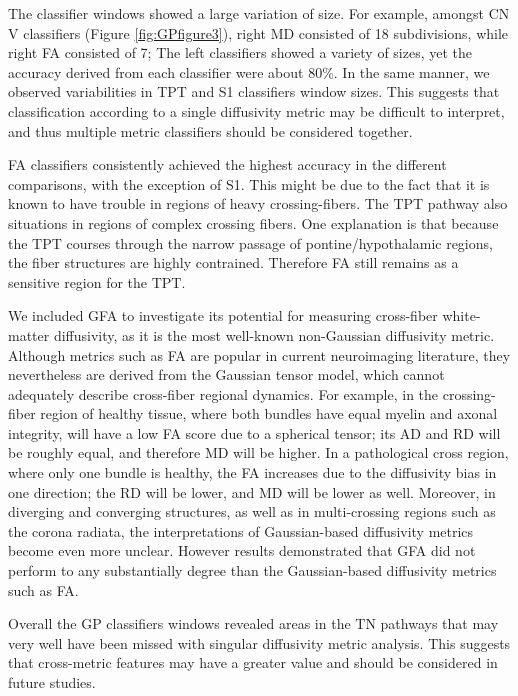 The classifier windows showed a large variation of size. For example, amongst CN V classifiers (Figure \ref{fig:GPfigure3}), right MD consisted of 18 subdivisions, while right FA consisted of 7; The left classifiers showed a variety of sizes, yet the accuracy derived from each classifier were about 80\%. In the same manner, we observed variabilities in TPT and S1 classifiers window sizes. This suggests that classification according to a single diffusivity metric may be difficult to interpret, and thus multiple metric classifiers should be considered together. 

FA classifiers consistently achieved the highest accuracy in the different comparisons, with the exception of S1. This might be due to the fact that it is known to have trouble in regions of heavy crossing-fibers. The TPT pathway also situations in regions of complex crossing fibers. One explanation is that because the TPT courses through the narrow passage of pontine/hypothalamic regions, the fiber structures are highly contrained. Therefore FA still remains as a sensitive region for the TPT. 

We included GFA to investigate its potential for measuring cross-fiber white-matter diffusivity, as it is the most well-known non-Gaussian diffusivity metric. Although metrics such as FA are popular in current neuroimaging literature, they nevertheless are derived from the Gaussian tensor model, which cannot adequately describe cross-fiber regional dynamics. For example, in the crossing-fiber region of healthy tissue, where both bundles have equal myelin and axonal integrity, will have a low FA score due to a spherical tensor; its AD and RD will be roughly equal, and therefore MD will be higher. In a pathological cross region, where only one bundle is healthy, the FA increases due to the diffusivity bias in one direction; the RD will be lower, and MD will be lower as well. Moreover, in diverging and converging structures, as well as in multi-crossing regions such as the corona radiata, the interpretations of Gaussian-based diffusivity metrics become even more unclear. 
However results demonstrated that GFA did not perform to any substantially degree than the Gaussian-based diffusivity metrics such as FA. 

Overall the GP classifiers windows revealed areas in the TN pathways that may very well have been missed with singular diffusivity metric analysis. This suggests that cross-metric features may have a greater value and should be considered in future studies. 

